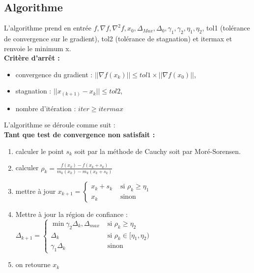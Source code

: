 \documentclass[a4paper,12pt]{article}
\theoremstyle{break}
\begin{document}
\subsection{Algorithme}

L'algorithme prend en entrée $f, \nabla f, \nabla^2 f, x_0,\Delta_{Max}, \Delta_0, \gamma_1, \gamma_2, \eta_1, \eta_2$, tol1 (tolérance de convergence sur le gradient), tol2 (tolérance de stagnation) et itermax et renvoie le minimum x.\\

\textbf{Critère d'arrêt : }
\begin{itemize}
\item convergence du gradient : $||\nabla f(x_k)|| \leq tol1 \times ||\nabla f(x_0)||$,
\item stagnation : $||x_(k+1) - x_k||  \leq tol2$,
\item nombre d'itération : $iter \geq itermax$\\
\end{itemize}

L'algorithme se déroule comme suit :\\
\textbf{Tant que test de convergence non satisfait :}
\begin{enumerate}
	\item calculer le point $s_k$ soit par la méthode de Cauchy soit par Moré-Sorensen.
	\item calculer $\rho_k = \frac{f(x_k) - f(x_k+s_k)}{m_k(x_k)-m_k(x_k+s_k)}$
	\item mettre à jour $x_{k+1} = \begin{cases}
x_k+s_k &\text{ si }\rho_k\geq\eta_1 \\
x_k &\text{ sinon }
\end{cases}$
	\item Mettre à jour la région de confiance : 
		$\Delta_{k+1} = \begin{cases}
			\min{\gamma_2\Delta_k, \Delta_{max}} &\text{ si }\rho_k\geq\eta_2 \\
			\Delta_k &\text{ si }\rho_k\in[\eta_1,\eta_2)\\
			\gamma_1\Delta_k &\text{ sinon }
		\end{cases}$
	\item on retourne $x_k$
\end{enumerate}
\end{document}
